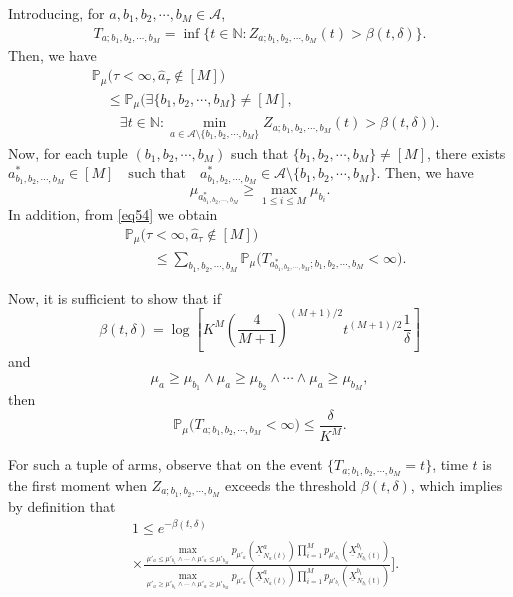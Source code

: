 \documentclass[final]{IEEEtran}
\newcommand{\nn}{\nonumber}
\begin{document}
Introducing, for \(a,b_1,b_2,\cdots,b_M \in \mathcal{A}\),
\begin{align*}
T_{a;b_1,b_2,\cdots,b_M} = \inf\{t \in \mathbb{N} : Z_{a;b_1,b_2,\cdots,b_M}(t) > \beta(t,\delta)\}.
\end{align*}
Then, we have
\begin{align}
&\mathbb{P}_{\mu}\big(\tau<\infty, \hat{a}_{\tau} \notin [M]\big) \nonumber \\
&\quad \leq \mathbb{P}_{\mu}\Big(\exists \{b_1,b_2,\cdots,b_M\} \neq [M], \nonumber \\
&\quad \quad \exists t \in \mathbb{N}: \min_{a \in \mathcal{A} \setminus \{b_1,b_2,\cdots,b_M\}} Z_{a;b_1,b_2,\cdots,b_M}(t) > \beta(t,\delta) \Big) \label{eq54}.
\end{align}
Now, for each tuple \((b_1,b_2,\cdots,b_M)\) such that \(\{b_1,b_2,\cdots,b_M\} \neq [M]\), there exists
$
a^*_{b_1,b_2,\cdots,b_M} \in [M] \quad \text{such that} \quad a^*_{b_1,b_2,\cdots,b_M} \in \mathcal{A} \setminus \{b_1,b_2,\cdots,b_M\}.
$
Then, we have
\[
\mu_{a^*_{b_1,b_2,\cdots,b_M}} \geq \max_{1 \leq i \leq M} \mu_{b_i}.
\]
In addition, from \eqref{eq54} we obtain
\begin{align}
&\mathbb{P}_{\mu}\big(\tau<\infty, \hat{a}_{\tau} \notin [M]\big) \nonumber \\
&\qquad \leq \sum_{b_1,b_2,\cdots,b_M} \mathbb{P}_{\mu}\big(T_{a^*_{b_1,b_2,\cdots,b_M};b_1,b_2,\cdots,b_M} < \infty\big).
\end{align}

Now, it is sufficient to show that if
\[
\beta(t,\delta) = \log \left[ K^M \left(\frac{4}{M+1}\right)^{(M+1)/2} t^{(M+1)/2} \frac{1}{\delta} \right]
\]
and
\[
\mu_a \geq \mu_{b_1} \wedge \mu_a \geq \mu_{b_2} \wedge \cdots \wedge \mu_a \geq \mu_{b_M},
\]
then
\[
\mathbb{P}_{\mu}\big(T_{a;b_1,b_2,\cdots,b_M} < \infty\big) \leq \frac{\delta}{K^M}.
\]

For such a tuple of arms, observe that on the event \(\{T_{a;b_1,b_2,\cdots,b_M} = t\}\), time \(t\) is the first moment when \(Z_{a;b_1,b_2,\cdots,b_M}\) exceeds the threshold \(\beta(t,\delta)\), which implies by definition that
\begin{align}
&1 \leq e^{-\beta(t,\delta)} \nn\\
&\times  \frac{
\max_{\mu'_a \leq \mu'_{b_1} \wedge \cdots \wedge \mu'_a \leq \mu'_{b_M}} p_{\mu'_a}(\underline{X}_{N_a(t)}^a) \prod_{i=1}^M p_{\mu'_{b_i}}(\underline{X}_{N_{b_i}(t)}^{b_i})
}{
\max_{\mu'_a \geq \mu'_{b_1} \wedge \cdots \wedge \mu'_a \geq \mu'_{b_M}} p_{\mu'_a}(\underline{X}_{N_a(t)}^a) \prod_{i=1}^M p_{\mu'_{b_i}}(\underline{X}_{N_{b_i}(t)}^{b_i})
}\Bigg]. 
\end{align}
\end{document}
